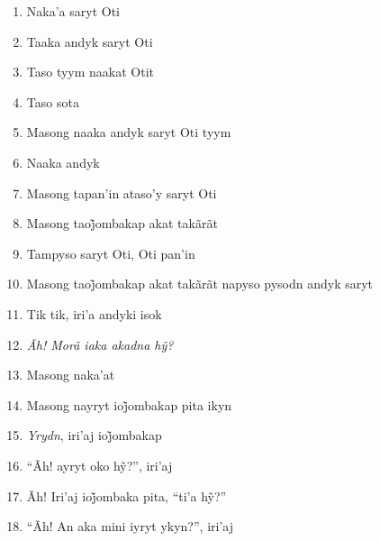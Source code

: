 \begin{enumerate}
 \item Naka'a saryt Oti

 \item Taaka andyk saryt Oti

 \item Taso tyym naakat Otit

 \item Taso sota

 \begin{center}\end{center}

 \item Masong naaka andyk saryt Oti tyym

 \item Naaka andyk

 \item Masong tapan'in ataso'y saryt Oti

 \item Masong taoj̃ombakap akat takãrãt

 \item Tampyso saryt Oti, Oti pan'in

 \begin{center}\end{center}

 \item Masong taoj̃ombakap akat takãrãt napyso pysodn andyk saryt

 \item Tik tik, iri'a andyki isok

 \item \textit{Ãh! Morã iaka akadna hỹ?}

 \item Masong naka'at

 \item Masong nayryt ioj̃ombakap pita ikyn

 \item \textit{Yrydn}, iri’aj ioj̃ombakap

 \item ``Ãh! ayryt oko hỹ?'', iri’aj

 \begin{center}\end{center}

 \item Ãh! Iri’aj ioj̃ombaka pita, ``ti’a hỹ?''

 \item ``Ãh! An aka mini iyryt ykyn?'', iri'aj


\end{enumerate}
